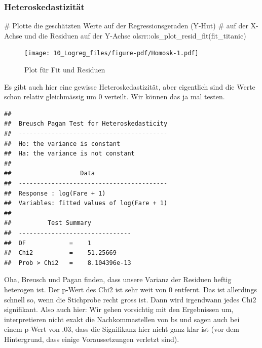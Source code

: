\documentclass[
  10pt,
  letterpaper,
  a4paper, twoside]{scrreprt}
\newenvironment{Shaded}{\begin{snugshade}}{\end{snugshade}}
\newcommand{\CommentTok}[1]{\textcolor[rgb]{0.37,0.37,0.37}{#1}}
\newcommand{\FunctionTok}[1]{\textcolor[rgb]{0.28,0.35,0.67}{#1}}
\newcommand{\NormalTok}[1]{\textcolor[rgb]{0.00,0.23,0.31}{#1}}
\newcommand{\SpecialCharTok}[1]{\textcolor[rgb]{0.37,0.37,0.37}{#1}}
\begin{document}
\subsubsection{Heteroskedastizität}\label{heteroskedastizituxe4t}

\begin{Shaded}
\begin{Highlighting}[]
\CommentTok{\# Plotte die geschätzten Werte auf der Regressionsgeraden (Y{-}Hut) }
\CommentTok{\# auf der X{-}Achse und die Residuen auf der Y{-}Achse}
\NormalTok{olsrr}\SpecialCharTok{::}\FunctionTok{ols\_plot\_resid\_fit}\NormalTok{(fit\_titanic)}
\end{Highlighting}
\end{Shaded}

\begin{figure}[H]

{\centering \texttt{[image: 10\_Logreg\_files/figure-pdf/Homosk-1.pdf]}

}

\caption{Plot für Fit und Residuen}

\end{figure}%

Es gibt auch hier eine gewisse Heteroskedastizität, aber eigentlich sind
die Werte schon relativ gleichmässig um 0 verteilt. Wir können das ja
mal testen.

\begin{verbatim}
## 
##  Breusch Pagan Test for Heteroskedasticity
##  -----------------------------------------
##  Ho: the variance is constant            
##  Ha: the variance is not constant        
## 
##                   Data                    
##  -----------------------------------------
##  Response : log(Fare + 1) 
##  Variables: fitted values of log(Fare + 1) 
## 
##          Test Summary           
##  -------------------------------
##  DF            =    1 
##  Chi2          =    51.25669 
##  Prob > Chi2   =    8.104396e-13
\end{verbatim}

Oha, Breusch und Pagan finden, dass unsere Varianz der Residuen heftig
heterogen ist. Der p-Wert des Chi2 ist sehr weit von 0 entfernt. Das ist
allerdings schnell so, wenn die Stichprobe recht gross ist. Dann wird
irgendwann jedes Chi2 signifikant. Also auch hier: Wir gehen vorsichtig
mit den Ergebnissen um, interpretieren nicht exakt die Nachkommastellen
von bs und sagen auch bei einem p-Wert von .03, dass die Signifikanz
hier nicht ganz klar ist (vor dem Hintergrund, dass einige
Voraussetzungen verletzt sind).
\end{document}
